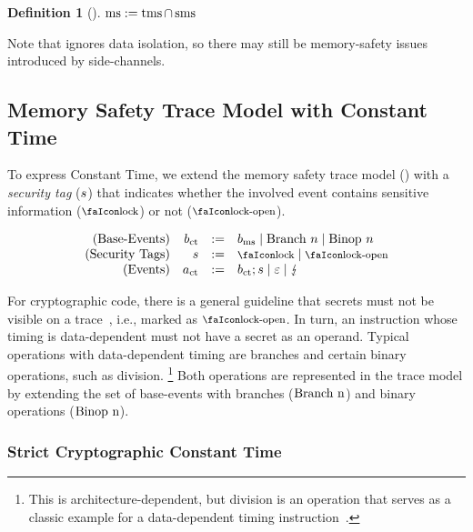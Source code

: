 \documentclass[dvipsnames,conference]{IEEEtran}
\theoremstyle{definition}
\newtheorem{definition}{Definition}[section]
\begin{document}
\begin{definition}[]\label{def:trace:msdef}
  $
  \operatorname{ms}:=\operatorname{tms} \cap \operatorname{sms}
  $
\end{definition}

Note that  ignores data isolation, so there may still be memory-safety issues introduced by side-channels.

\subsection{Memory Safety Trace Model with Constant Time}\label{subsec:scct:tracemodel}

To express Constant Time, we extend the memory safety trace model () with a {\em security tag} ($s{}$) that indicates whether the involved event contains sensitive information ($\lock$) or not ($\unlock$).

\vspace{-.5em}
\[
  \begin{array}{rrcl}
    (\text{Base-Events}) & \preevent[_{\ctsafe}] &:=& \preevent[_{\mssafe}] \mid \ev{Branch\ }n \mid \ev{Binop\ }n\\
    (\text{Security Tags}) & \securitytag{} &:=& \lock \mid \unlock\\ 
    (\text{Events}) & \event[_{\ctsafe}] &:=& \preevent[_{\ctsafe}];\securitytag{} \mid \emptyevent \mid \lightning \\ 
  \end{array}
\]

For cryptographic code, there is a general guideline that secrets must not be visible on a trace~\cite{ctguidelines}, i.e., marked as $\unlock$.
In turn, an instruction whose timing is data-dependent must not have a secret as an operand.
Typical operations with data-dependent timing are branches and certain binary operations, such as division.%
\footnote{
	This is architecture-dependent, but division is an operation that serves as a classic example for a data-dependent timing instruction~\cite[p.~755]{arm-refman}.
}
Both operations are represented in the trace model by extending the set of base-events with branches ($\text{Branch\ n}$) and binary operations ($\text{Binop\ n}$).

\subsubsection{Strict Cryptographic Constant Time}
\end{document}

